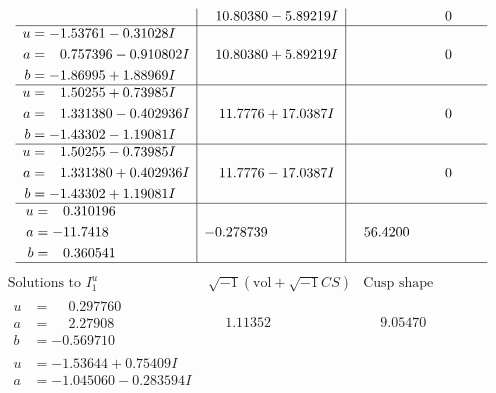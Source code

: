 \documentclass[1p]{elsarticle_modified}
\theoremstyle{definition}
\newcommand{\I}{\sqrt{-1}}
\begin{document}
$$\begin{array}{c|c|c}
 & \phantom{-}10.80380 - 5.89219 I & \phantom{-0.000000 } 0 \\ \hline\begin{aligned}
u &= -1.53761 - 0.31028 I \\
a &= \phantom{-}0.757396 - 0.910802 I \\
b &= -1.86995 + 1.88969 I\end{aligned}
 & \phantom{-}10.80380 + 5.89219 I & \phantom{-0.000000 } 0 \\ \hline\begin{aligned}
u &= \phantom{-}1.50255 + 0.73985 I \\
a &= \phantom{-}1.331380 - 0.402936 I \\
b &= -1.43302 - 1.19081 I\end{aligned}
 & \phantom{-}11.7776 + 17.0387 I & \phantom{-0.000000 } 0 \\ \hline\begin{aligned}
u &= \phantom{-}1.50255 - 0.73985 I \\
a &= \phantom{-}1.331380 + 0.402936 I \\
b &= -1.43302 + 1.19081 I\end{aligned}
 & \phantom{-}11.7776 - 17.0387 I & \phantom{-0.000000 } 0 \\ \hline\begin{aligned}
u &= \phantom{-}0.310196\phantom{ +0.000000I} \\
a &= -11.7418\phantom{ +0.000000I} \\
b &= \phantom{-}0.360541\phantom{ +0.000000I}\end{aligned}
 & -0.278739\phantom{ +0.000000I} & \phantom{-}56.4200\phantom{ +0.000000I}\\
 \hline 
 \end{array}$$\newpage$$\begin{array}{c|c|c}  
\text{Solutions to }I^u_{1}& \I (\text{vol} + \sqrt{-1}CS) & \text{Cusp shape}\\
 \hline 
\begin{aligned}
u &= \phantom{-}0.297760\phantom{ +0.000000I} \\
a &= \phantom{-}2.27908\phantom{ +0.000000I} \\
b &= -0.569710\phantom{ +0.000000I}\end{aligned}
 & \phantom{-}1.11352\phantom{ +0.000000I} & \phantom{-}9.05470\phantom{ +0.000000I} \\ \hline\begin{aligned}
u &= -1.53644 + 0.75409 I \\
a &= -1.045060 - 0.283594 I \\

\end{aligned}
\end{array}$$
\end{document}
